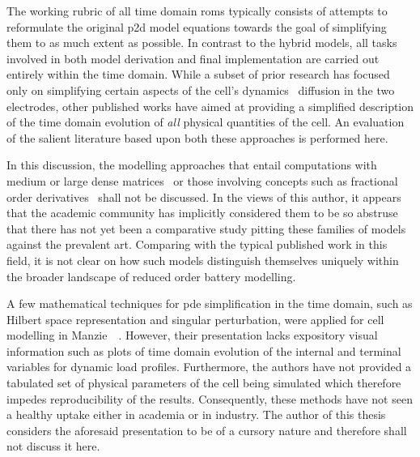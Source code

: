 The working rubric of all time domain \glspl{rom} typically consists of attempts
to  reformulate the  original  \gls{p2d}  model equations  towards  the goal  of
simplifying  them to  as much  extent  as possible.  In contrast  to the  hybrid
models, all tasks involved in both model derivation and final implementation are
carried out  entirely within the time  domain. While a subset  of prior research
has  focused  only  on  simplifying  certain  aspects  of  the  cell's  dynamics
\eg~diffusion  in  the two  electrodes,  other  published  works have  aimed  at
providing a  simplified description of  the time domain evolution  of \emph{all}
physical quantities of  the cell. An evaluation of the  salient literature based
upon both these approaches is performed here.


In  this discussion,  the  modelling approaches  that  entail computations  with
medium or large dense matrices~\cite{Li2016,Xu2016,Corno2015} or those involving
concepts such  as fractional  order derivatives~\cite{Sabatier2014,Sabatier2015,
Li2017, Mu2017, Wang2017}  shall not be discussed. In the  views of this author,
it appears that  the academic community has implicitly considered  them to be so
abstruse that there has not yet  been a comparative study pitting these families
of models against  the prevalent art. Comparing with the  typical published work
in  this field,  it  is not  clear  on how  such  models distinguish  themselves
uniquely within the broader landscape of reduced order battery modelling.


A few mathematical  techniques for \gls{pde} simplification in  the time domain,
such as Hilbert space representation and singular perturbation, were applied for
cell  modelling in  Manzie~\etal~\cite{Manzie2015}. However,  their presentation
lacks expository  visual information such as  plots of time domain  evolution of
the internal and terminal variables  for dynamic load profiles. Furthermore, the
authors  have  not provided  a  tabulated  set  of  physical parameters  of  the
cell being  simulated which  therefore impedes  reproducibility of  the results.
Consequently, these methods have not seen a healthy uptake either in academia or
in industry. The  author of this thesis  considers the aforesaid presentation to
be of a cursory nature  and therefore  shall  not discuss it here.



